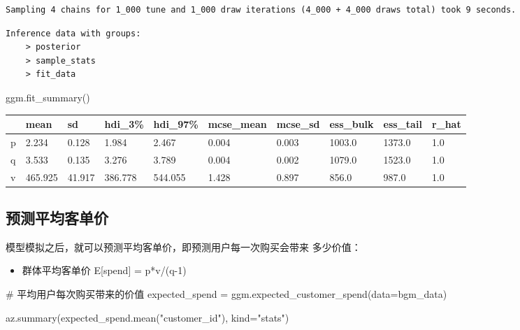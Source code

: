 \documentclass[
]{ctexart}
\newenvironment{Shaded}{\begin{snugshade}}{\end{snugshade}}
\newcommand{\CommentTok}[1]{\textcolor[rgb]{0.37,0.37,0.37}{#1}}
\newcommand{\NormalTok}[1]{\textcolor[rgb]{0.00,0.23,0.31}{#1}}
\newcommand{\OperatorTok}[1]{\textcolor[rgb]{0.37,0.37,0.37}{#1}}
\newcommand{\StringTok}[1]{\textcolor[rgb]{0.13,0.47,0.30}{#1}}
\newcounter{none} %
\providecommand{\tightlist}{%
  \setlength{\itemsep}{0pt}\setlength{\parskip}{0pt}}
\begin{document}
\begin{verbatim}
Sampling 4 chains for 1_000 tune and 1_000 draw iterations (4_000 + 4_000 draws total) took 9 seconds.
\end{verbatim}

\begin{verbatim}
Inference data with groups:
    > posterior
    > sample_stats
    > fit_data
\end{verbatim}

\begin{Shaded}
\begin{Highlighting}[]
\NormalTok{ggm.fit\_summary() }
\end{Highlighting}
\end{Shaded}

{\def\LTcaptype{none} %
\begin{longtable}[]{@{}llllllllll@{}}
\toprule\noalign{}
& mean & sd & hdi\_3\% & hdi\_97\% & mcse\_mean & mcse\_sd & ess\_bulk &
ess\_tail & r\_hat \\
\midrule\noalign{}
\endhead
\bottomrule\noalign{}
\endlastfoot
p & 2.234 & 0.128 & 1.984 & 2.467 & 0.004 & 0.003 & 1003.0 & 1373.0 &
1.0 \\
q & 3.533 & 0.135 & 3.276 & 3.789 & 0.004 & 0.002 & 1079.0 & 1523.0 &
1.0 \\
v & 465.925 & 41.917 & 386.778 & 544.055 & 1.428 & 0.897 & 856.0 & 987.0
& 1.0 \\
\end{longtable}
}

\subsection{预测平均客单价}\label{ux9884ux6d4bux5e73ux5747ux5ba2ux5355ux4ef7}

模型模拟之后，就可以预测平均客单价，即预测用户每一次购买会带来
多少价值：

\begin{itemize}
\tightlist
\item
  群体平均客单价 E{[}spend{]} = p*v/(q-1)
\end{itemize}

\begin{Shaded}
\begin{Highlighting}[]
\CommentTok{\# 平均用户每次购买带来的价值}
\NormalTok{expected\_spend }\OperatorTok{=}\NormalTok{ ggm.expected\_customer\_spend(data}\OperatorTok{=}\NormalTok{bgm\_data)}

\NormalTok{az.summary(expected\_spend.mean(}\StringTok{"customer\_id"}\NormalTok{), kind}\OperatorTok{=}\StringTok{"stats"}\NormalTok{)}
\end{Highlighting}
\end{Shaded}
\end{document}
